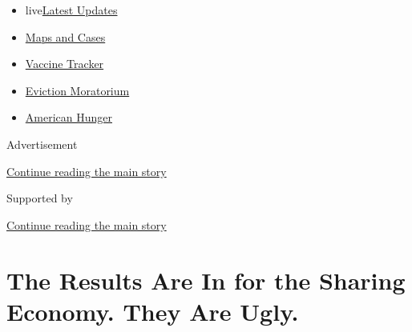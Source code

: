 \begin{itemize}
\tightlist
\item
  live\href{https://www.nytimes3xbfgragh.onion/2020/09/08/world/covid-19-coronavirus.html?name=styln-coronavirus-markets\&region=TOP_BANNER\&block=storyline_menu_recirc\&action=click\&pgtype=Article\&impression_id=e5534311-f1c2-11ea-85e0-dd64533a7a3e\&variant=undefined}{Latest
  Updates}
\item
  \href{https://www.nytimes3xbfgragh.onion/interactive/2020/us/coronavirus-us-cases.html?name=styln-coronavirus-markets\&region=TOP_BANNER\&block=storyline_menu_recirc\&action=click\&pgtype=Article\&impression_id=e5534312-f1c2-11ea-85e0-dd64533a7a3e\&variant=undefined}{Maps
  and Cases}
\item
  \href{https://www.nytimes3xbfgragh.onion/interactive/2020/science/coronavirus-vaccine-tracker.html?name=styln-coronavirus-markets\&region=TOP_BANNER\&block=storyline_menu_recirc\&action=click\&pgtype=Article\&impression_id=e5536a20-f1c2-11ea-85e0-dd64533a7a3e\&variant=undefined}{Vaccine
  Tracker}
\item
  \href{https://www.nytimes3xbfgragh.onion/2020/09/02/your-money/eviction-moratorium-covid.html?name=styln-coronavirus-markets\&region=TOP_BANNER\&block=storyline_menu_recirc\&action=click\&pgtype=Article\&impression_id=e5536a21-f1c2-11ea-85e0-dd64533a7a3e\&variant=undefined}{Eviction
  Moratorium}
\item
  \href{https://www.nytimes3xbfgragh.onion/interactive/2020/09/02/magazine/food-insecurity-hunger-us.html?name=styln-coronavirus-markets\&region=TOP_BANNER\&block=storyline_menu_recirc\&action=click\&pgtype=Article\&impression_id=e5540660-f1c2-11ea-85e0-dd64533a7a3e\&variant=undefined}{American
  Hunger}
\end{itemize}

Advertisement

\protect\hyperlink{after-top}{Continue reading the main story}

Supported by

\protect\hyperlink{after-sponsor}{Continue reading the main story}

\hypertarget{the-results-are-in-for-the-sharing-economy-they-are-ugly}{%
\section{The Results Are In for the Sharing Economy. They Are
Ugly.}\label{the-results-are-in-for-the-sharing-economy-they-are-ugly}}

